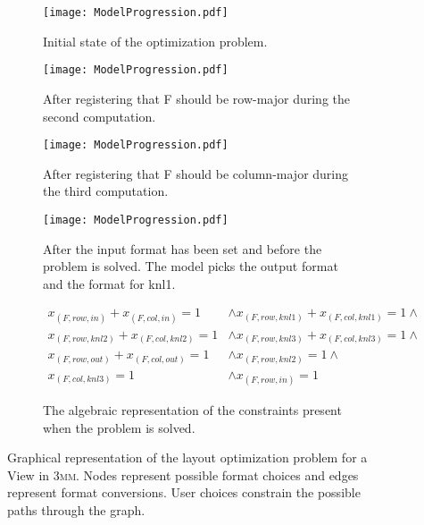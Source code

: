 \begin{figure}
	\begin{subfigure}[t]{0.2\textwidth}
		\texttt{[image: ModelProgression.pdf]}
		\caption{Initial state of the optimization problem.}
		\label{graphModel:1}
	\end{subfigure}
	\hspace{0.05\textwidth}
	\begin{subfigure}[t]{0.2\textwidth}
		\texttt{[image: ModelProgression.pdf]}
		\caption{After registering that F should be row-major during the second computation.}
		\label{graphModel:2}
	\end{subfigure}

	\begin{subfigure}[t]{0.2\textwidth}
		\texttt{[image: ModelProgression.pdf]}
		\caption{After registering that F should be column-major during the third computation.}
		\label{graphModel:3}
	\end{subfigure}
	\hspace{0.05\textwidth}
	\begin{subfigure}[t]{0.2\textwidth}
		\texttt{[image: ModelProgression.pdf]}
		\caption{After the input format has been set and before the problem is solved. The model picks the output format and the format for knl1.}
		\label{graphModel:4}
	\end{subfigure}

	\vspace{5px}

	\begin{subfigure}{0.45\textwidth}
		\begin{align*}
			x_{(F,row,in)} + x_{(F,col,in)} = 1 &\wedge 
		x_{(F,row,knl1)} + x_{(F,col,knl1)} = 1 \wedge \\
		x_{(F,row,knl2)} + x_{(F,col,knl2)} = 1 &\wedge 
		x_{(F,row,knl3)} + x_{(F,col,knl3)} = 1 \wedge \\
		x_{(F,row,out)} + x_{(F,col,out)} = 1 &\wedge 
		x_{(F,row,knl2)} = 1 \wedge\\
			x_{(F,col,knl3)} = 1 &\wedge x_{(F,row,in)} = 1
		\end{align*}
		
		\caption{The algebraic representation of the constraints present when the problem is solved.}
		\label{graphModel:5}
	\end{subfigure}

	\caption{Graphical representation of the layout optimization problem for a View in \textsc{3mm}. Nodes represent possible format choices and edges represent format conversions. User choices constrain the possible paths through the graph.}
	\label{graphModel}

\end{figure}


